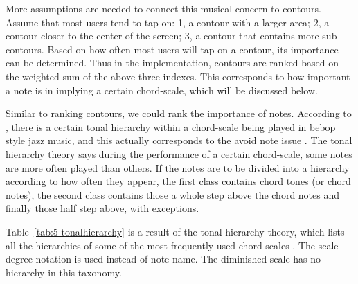 More assumptions are needed to connect this musical concern to contours. Assume that most users tend to tap on: 1, a contour with a larger area; 2, a contour closer to the center of the screen; 3, a contour that contains more sub-contours. Based on how often most users will tap on a contour, its importance can be determined. Thus in the implementation, contours are ranked based on the weighted sum of the above three indexes. This corresponds to how important a note is in implying a certain chord-scale, which will be discussed below.

Similar to ranking contours, we could rank the importance of notes. According to \cite{jarvinen1995tonal}, there is a certain tonal hierarchy within a chord-scale being played in bebop style jazz music, and this actually corresponds to the avoid note issue \cite{nettles1987harmony}. The tonal hierarchy theory says during the performance of a certain chord-scale, some notes are more often played than others. If the notes are to be divided into a hierarchy according to how often they appear, the first class contains chord tones (or chord notes), the second class contains those a whole step above the chord notes and finally those half step above, with exceptions.

Table~\ref{tab:5-tonalhierarchy} is a result of the tonal hierarchy theory, which lists all the hierarchies \cite{nettles1987harmony} of some of the most frequently used chord-scales \cite{garyburtoncourse}. The scale degree notation is used instead of note name. The diminished scale has no hierarchy in this taxonomy.


